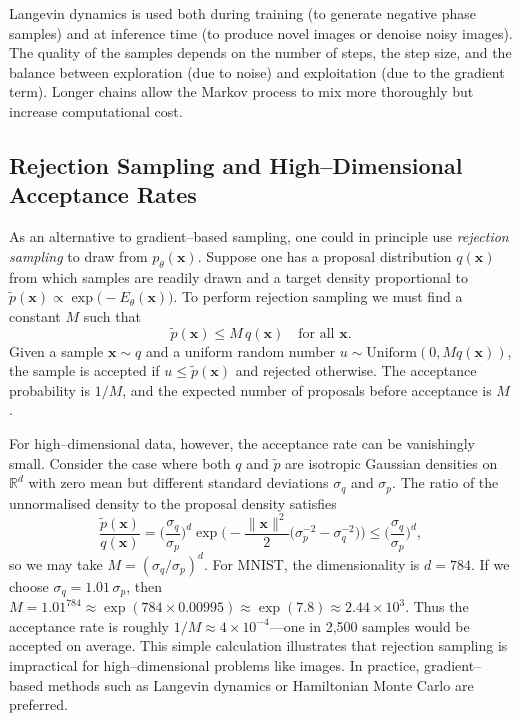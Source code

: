 Langevin dynamics is used both during training (to generate negative phase
samples) and at inference time (to produce novel images or denoise noisy
images).  The quality of the samples depends on the number of steps, the
step size, and the balance between exploration (due to noise) and
exploitation (due to the gradient term).  Longer chains allow the Markov
process to mix more thoroughly but increase computational cost.

\subsection{Rejection Sampling and High--Dimensional Acceptance Rates}

As an alternative to gradient–based sampling, one could in principle use
\emph{rejection sampling} to draw from $p_\theta(\mathbf{x})$.  Suppose
one has a proposal distribution $q(\mathbf{x})$ from which samples are
readily drawn and a target density proportional to $\tilde{p}(\mathbf{x})
\propto \exp\big(-E_\theta(\mathbf{x})\big)$.  To perform rejection sampling
we must find a constant $M$ such that
\begin{equation}
    \tilde{p}(\mathbf{x}) \leq M\,q(\mathbf{x}) \quad \text{for all }\mathbf{x}.
\end{equation}
Given a sample $\mathbf{x}\sim q$ and a uniform random number $u\sim
\mathrm{Uniform}(0,M q(\mathbf{x}))$, the sample is accepted if $u \leq
\tilde{p}(\mathbf{x})$ and rejected otherwise.  The acceptance probability is
$1/M$, and the expected number of proposals before acceptance is $M$.

For high–dimensional data, however, the acceptance rate can be vanishingly
small.  Consider the case where both $q$ and $\tilde{p}$ are isotropic
Gaussian densities on $\mathbb{R}^d$ with zero mean but different standard
deviations $\sigma_q$ and $\sigma_p$.  The ratio of the unnormalised
density to the proposal density satisfies
\begin{equation}
    \frac{\tilde{p}(\mathbf{x})}{q(\mathbf{x})}
    = \Big(\frac{\sigma_q}{\sigma_p}\Big)^d \exp\Big(-\frac{\|\mathbf{x}\|^2}{2}
      \big(\sigma_p^{-2} - \sigma_q^{-2}\big)\Big) \leq
    \Big(\frac{\sigma_q}{\sigma_p}\Big)^d,
\end{equation}
so we may take $M=(\sigma_q/\sigma_p)^d$.  For MNIST, the dimensionality
is $d=784$.  If we choose $\sigma_q = 1.01\,\sigma_p$, then $M = 1.01^{784}
\approx \exp(784\times 0.00995) \approx \exp(7.8) \approx 2.44\times 10^3$.
Thus the acceptance rate is roughly $1/M \approx 4\times 10^{-4}$—one in
2,500 samples would be accepted on average.  This simple calculation
illustrates that rejection sampling is impractical for high–dimensional
problems like images.  In practice, gradient–based methods such as
Langevin dynamics or Hamiltonian Monte Carlo are preferred.

